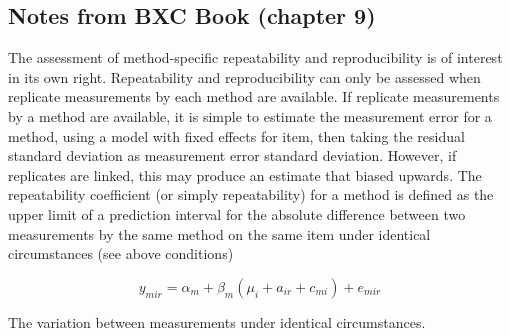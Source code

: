 \documentclass[12pt, a4paper]{article}
\begin{document}
	

	
	





\newpage


\subsection{Notes from BXC Book (chapter 9)}
The assessment of method-specific repeatability and reproducibility is of interest in its own right.
Repeatability and reproducibility can only be assessed when replicate measurements by each method are available.
If replicate measurements by a method are available, it is simple to estimate the measurement error for a method, using a model with fixed effects for item, then taking the residual standard deviation as measurement error standard deviation.
However, if replicates are linked, this may produce an estimate that biased upwards.
The repeatability coefficient (or simply repeatability) for a method is defined as the upper limit of a
prediction interval for the absolute difference between two measurements by the same method on the same
item under identical circumstances (see above conditions)

\[y_{mir}  = \alpha_{m} + \beta_m( \mu_i + a_{ir} + c_{mi}) + e_{mir}\]

The variation between measurements under identical circumstances.








\end{document}
